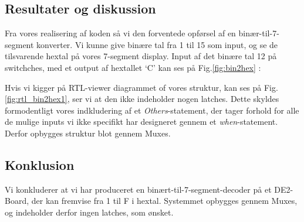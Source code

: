 \documentclass[../journal.tex]{subfiles}
\begin{document}
%            

\subsection{Resultater og diskussion}


Fra vores realisering af koden så vi den forventede opførsel af en binær-til-7-segment konverter. Vi kunne give binære tal fra 1 til 15 som input, og se de tilsvarende hextal på vores 7-segment display. Input af det binære tal 12 på switchches, med et output af hextallet `C' kan ses på Fig.\ref{fig:bin2hex} :


Hvis vi kigger på RTL-viewer diagrammet of vores struktur, kan ses på Fig.\ref{fig:rtl_bin2hex1}, ser vi at den ikke indeholder nogen latches. Dette skyldes formodentligt vores indkludering af et \textit{Others}-statement, der tager forhold for alle de mulige inputs vi ikke specifikt har designeret gennem et \textit{when}-statement. Derfor opbygges struktur blot gennem Muxes.


\subsection{Konklusion}

Vi konkluderer at vi har produceret en binært-til-7-segment-decoder på et DE2-Board, der kan fremvise fra 1 til F i hextal. Systemmet opbygges gennem Muxes, og indeholder derfor ingen latches, som ønsket. 
\end{document}
